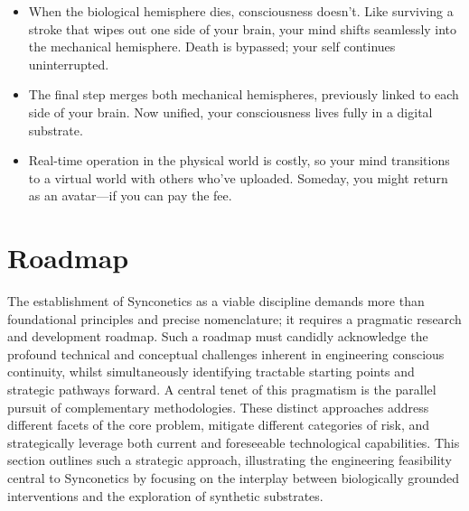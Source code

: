 \documentclass[10pt]{article}
\begin{document}
\begin{sloppypar}
\begin{itemize}
    \item When the biological hemisphere dies, consciousness doesn’t. Like surviving a stroke that wipes out one side of your brain, your mind shifts seamlessly into the mechanical hemisphere. Death is bypassed; your self continues uninterrupted.
    \item The final step merges both mechanical hemispheres, previously linked to each side of your brain. Now unified, your consciousness lives fully in a digital substrate.
    \item Real-time operation in the physical world is costly, so your mind transitions to a virtual world with others who’ve uploaded. Someday, you might return as an avatar—if you can pay the fee.
  \end{itemize}


  \section{Roadmap}
  \label{sec:roadmap}

  The establishment of Synconetics as a viable discipline demands more than foundational principles and precise nomenclature; it requires a pragmatic research and development roadmap. Such a roadmap must candidly acknowledge the profound technical and conceptual challenges inherent in engineering conscious continuity, whilst simultaneously identifying tractable starting points and strategic pathways forward. A central tenet of this pragmatism is the parallel pursuit of complementary methodologies. These distinct approaches address different facets of the core problem, mitigate different categories of risk, and strategically leverage both current and foreseeable technological capabilities. This section outlines such a strategic approach, illustrating the engineering feasibility central to Synconetics by focusing on the interplay between biologically grounded interventions and the exploration of synthetic substrates.


\end{sloppypar}
\end{document}
